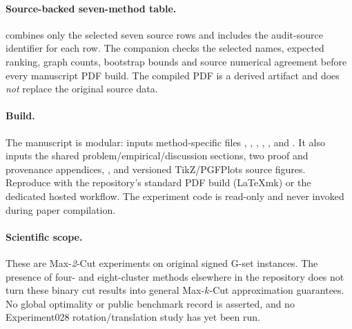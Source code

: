 \paragraph{Source-backed seven-method table.}
 combines only the selected seven source rows and includes the audit-source identifier for each row. The companion  checks the selected names, expected ranking, graph counts, bootstrap bounds and source numerical agreement before every manuscript PDF build. The compiled PDF is a derived artifact and does \emph{not} replace the original source data.

\paragraph{Build.}
The manuscript is modular:  inputs method-specific files , , , , ,  and . It also inputs the shared problem/empirical/discussion sections, two proof and provenance appendices, , and versioned TikZ/PGFPlots source figures. Reproduce with the repository's standard PDF build (LaTeXmk) or the dedicated hosted workflow. The experiment code is read-only and never invoked during paper compilation.

\paragraph{Scientific scope.}
These are Max-\emph{2}-Cut experiments on original signed G-set instances. The presence of four- and eight-cluster methods elsewhere in the repository does not turn these binary cut results into general Max-$k$-Cut approximation guarantees. No global optimality or public benchmark record is asserted, and no Experiment028 rotation/translation study has yet been run.

